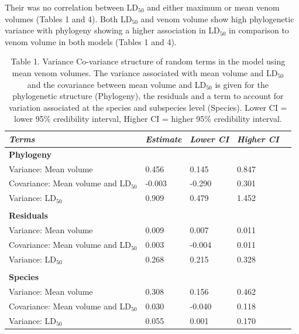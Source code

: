 Their was no correlation between LD$_{50}$ and either maximum or mean venom volumes (Tables 1 and 4). Both LD$_{50}$  and venom volume show high phylogenetic variance with phylogeny showing a higher association in LD$_{50}$ in comparison to venom volume in both models (Tables 1 and 4). 

\clearpage

\begin{table}[H]
  \centering
    \caption*{Table 1. Variance Co-variance structure of random terms in the model using mean venom volumes. The variance associated with mean volume and LD$_{50}$ and the covariance between mean volume and LD$_{50}$ is given for the phylogenetic structure (Phylogeny), the residuals and a term to account for variation associated at the species and subspecies level (Species). Lower CI = lower 95\% credibility interval, Higher CI = higher 95\% credibility interval.}
\begin{tabular}{*5l}    \toprule
\emph{Terms} & \emph{Estimate} & \emph{Lower CI} & \emph{Higher CI}\\\midrule
\textbf{Phylogeny} &   &   &  \\ 
Variance: Mean volume & 0.456 & 0.145 & 0.847 \\
Covariance: Mean volume and LD$_{50}$ & -0.003  & -0.290  & 0.301 \\
Variance: LD$_{50}$ & 0.909 & 0.479 & 1.452 \\

 &   &   &  \\

\textbf{Residuals} &   &   &  \\ 
Variance: Mean volume & 0.009 & 0.007 & 0.011 \\
Covariance: Mean volume and LD$_{50}$ & 0.003  & -0.004  & 0.011 \\
Variance: LD$_{50}$ & 0.268 & 0.215 & 0.328 \\

 &   &   &  \\ 

\textbf{Species} &   &   &  \\ 
Variance: Mean volume & 0.308 & 0.156 & 0.462 \\
Covariance: Mean volume and LD$_{50}$ & 0.030  & -0.040  & 0.118 \\
Variance: LD$_{50}$ & 0.055 & 0.001 & 0.170 \\\bottomrule
 \hline
\end{tabular}
  \label{tbl:Table 1.}
\end{table}




